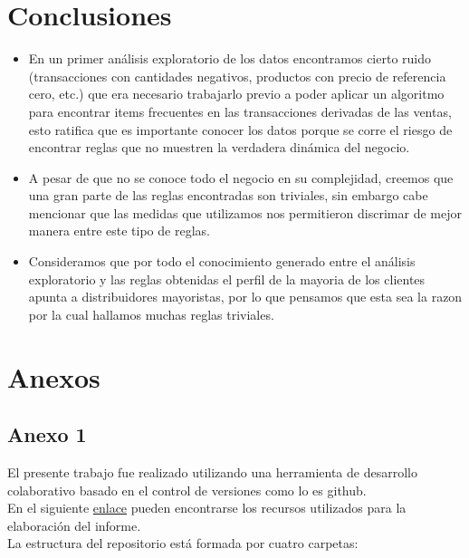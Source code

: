 \documentclass[]{article}
\begin{document}
	\section{Conclusiones}
	\begin{itemize}
		\item En un primer análisis exploratorio de los datos encontramos cierto ruido (transacciones con cantidades negativos, productos con precio de referencia cero, etc.) que era necesario trabajarlo previo a poder aplicar un algoritmo para encontrar items frecuentes en las transacciones derivadas de las ventas, esto ratifica que es importante conocer los datos porque se corre el riesgo de encontrar reglas que no muestren la verdadera dinámica del negocio.\\
		\item A pesar de que no se conoce todo el negocio en su complejidad, creemos que una gran parte de las reglas encontradas son triviales, sin embargo cabe mencionar que las medidas que utilizamos nos permitieron discrimar de mejor manera entre este tipo de reglas.\\
		\item Consideramos que por todo el conocimiento generado entre el análisis exploratorio y las reglas obtenidas el perfil de la mayoria de los clientes apunta a distribuidores mayoristas, por lo que pensamos que esta sea la razon por la cual hallamos muchas reglas triviales.\\
	\end{itemize}
	
	\section*{Anexos}
	
	\subsection*{Anexo 1}
	
	El presente trabajo fue realizado utilizando una herramienta de desarrollo colaborativo basado en el control de versiones como lo es github.\\
	
	\noindent En el siguiente \href{https://github.com/jairoji/DM_TP1/tree/master/TP1}{enlace} pueden encontrarse los recursos utilizados para la elaboración del informe.\\
	 
	
	\noindent La estructura del repositorio está formada por cuatro carpetas:\\
	
\end{document}
